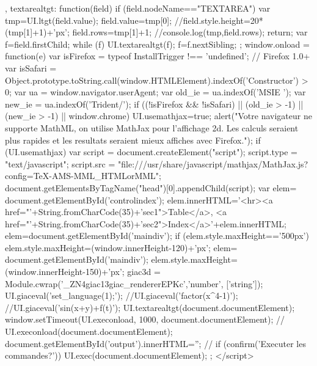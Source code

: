 {{{{   },
  textarealtgt: function(field){
     if (field.nodeName=="TEXTAREA"){
        var tmp=UI.ltgt(field.value);
        field.value=tmp[0];
        //field.style.height=20*(tmp[1]+1)+'px';
        field.rows=tmp[1]+1;
        //console.log(tmp,field.rows);
        return;
     }
     var f=field.firstChild;
     while (f){
       UI.textarealtgt(f);
       f=f.nextSibling;
     }
   }
 };
 window.onload = function(e){
   var isFirefox = typeof InstallTrigger !== 'undefined';   // Firefox 1.0+
   var isSafari = Object.prototype.toString.call(window.HTMLElement).indexOf('Constructor') > 0;
  var ua = window.navigator.userAgent;
  var old_ie = ua.indexOf('MSIE ');
  var new_ie = ua.indexOf('Trident/');
  if ((!isFirefox && !isSafari) || (old_ie > -1) || (new_ie > -1) || window.chrome){
     UI.usemathjax=true;
     alert("Votre navigateur ne supporte MathML, on utilise MathJax pour l'affichage 2d.  Les calculs seraient plus rapides et les resultats seraient mieux affiches avec Firefox.");
  }
  if (UI.usemathjax){
    var script = document.createElement("script");
    script.type = "text/javascript";
    script.src  = "file:///usr/share/javascript/mathjax/MathJax.js?config=TeX-AMS-MML_HTMLorMML";
    document.getElementsByTagName("head")[0].appendChild(script);
  }
  var elem= document.getElementById('controlindex');
  elem.innerHTML='<hr><a href="'+String.fromCharCode(35)+'sec1">Table</a>, <a href="'+String.fromCharCode(35)+'sec2">Index</a>'+elem.innerHTML;
  elem=document.getElementById('maindiv');
  if (elem.style.maxHeight=='500px')
    elem.style.maxHeight=(window.innerHeight-120)+'px';
  elem= document.getElementById('maindiv');
  elem.style.maxHeight=(window.innerHeight-150)+'px';
  giac3d = Module.cwrap('_ZN4giac13giac_rendererEPKc','number', ['string']);
  UI.giaceval('set_language(1);');
  //UI.giaceval('factor(x^4-1)');
  //UI.giaceval('sin(x+y)+f(t)');
  UI.textarealtgt(document.documentElement);
  window.setTimeout(UI.execonload, 1000, document.documentElement); // UI.execonload(document.documentElement);
  document.getElementById('output').innerHTML='';
 // if (confirm('Executer les commandes?')) UI.exec(document.documentElement);
 };
</script>
}
}
\else
\newcommand{\loadgiacscriptend}{}
\fi
\ifhevea
\newcommand{\giacpython}{
\@print{<button onclick="UI.python=1;" style="display:none"></button><span style="display:none">onload</span>}
}
\newenvironment{giacprog}{
\verbatim}
{\endverbatim 
\@print{<button onclick="var field=parentNode.previousSibling; var tmp=field.innerHTML;if(tmp.length==0) tmp=field.value;var t=createElement('TEXTAREA');t.style.fontSize=16;t.cols=60;t.rows=10;var tmp1=UI.ltgt(tmp);t.value=tmp1[0];tmp=UI.caseval(tmp);tmp=UI.rmquote(tmp);nextSibling.innerHTML=tmp; UI.render_canvas(nextSibling); field.parentNode.insertBefore(t,field);field.parentNode.removeChild(field);">exe</button><span></span><br>
}
}
